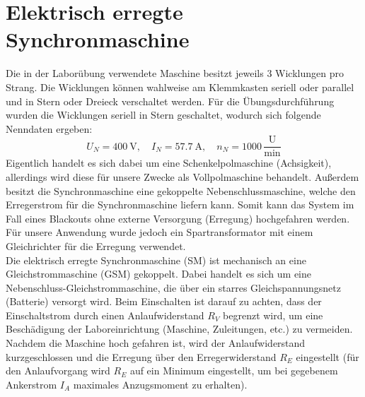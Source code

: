 \section{Elektrisch erregte Synchronmaschine}
Die in der Laborübung verwendete Maschine besitzt jeweils 3 Wicklungen pro Strang. Die Wicklungen können wahlweise am Klemmkasten seriell oder parallel und in Stern oder Dreieck verschaltet werden. Für die Übungsdurchführung wurden die Wicklungen seriell in Stern geschaltet, wodurch sich folgende Nenndaten ergeben:
\begin{equation*}
    U_N=\SI{400}{\volt}, \quad I_N = \SI{57.7}{\ampere}, \quad n_N = 1000\,\frac{\textrm{U}}{\textrm{min}}
\end{equation*}
Eigentlich handelt es sich dabei um eine Schenkelpolmaschine (Achsigkeit), allerdings wird diese für unsere Zwecke als Vollpolmaschine behandelt. Außerdem besitzt die Synchronmaschine eine gekoppelte Nebenschlussmaschine, welche den Erregerstrom für die Synchronmaschine liefern kann. Somit kann das System im Fall eines Blackouts ohne externe Versorgung (Erregung) hochgefahren werden. Für unsere Anwendung wurde jedoch ein Spartransformator mit einem Gleichrichter für die Erregung verwendet.\\
Die elektrisch erregte Synchronmaschine (SM) ist mechanisch an eine Gleichstrommaschine (GSM) gekoppelt. Dabei handelt es sich um eine Nebenschluss-Gleichstrommaschine, die über ein starres Gleichspannungsnetz (Batterie) versorgt wird. Beim Einschalten ist darauf zu achten, dass der Einschaltstrom durch einen Anlaufwiderstand $R_V$ begrenzt wird, um eine Beschädigung der Laboreinrichtung (Maschine, Zuleitungen, etc.) zu vermeiden. Nachdem die Maschine hoch gefahren ist, wird der Anlaufwiderstand kurzgeschlossen und die Erregung über den Erregerwiderstand $R_E$ eingestellt (für den Anlaufvorgang wird $R_E$ auf ein Minimum eingestellt, um bei gegebenem Ankerstrom $I_A$ maximales Anzugsmoment zu erhalten).
